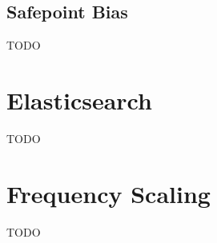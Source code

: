 \fi

\subsection{Safepoint Bias}






TODO

\section{Elasticsearch}

TODO

\section{Frequency Scaling}

TODO







